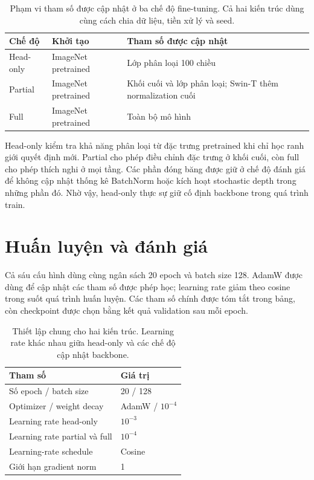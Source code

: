 \documentclass[12pt,a4paper]{report}
\begin{document}
\begin{table}[htbp]\centering
\begin{tabularx}{\textwidth}{@{}l l X@{}}
\toprule
Chế độ & Khởi tạo & Tham số được cập nhật\\\midrule
Head-only & ImageNet pretrained & Lớp phân loại 100 chiều\\
Partial & ImageNet pretrained & Khối cuối và lớp phân loại; Swin-T thêm normalization cuối\\
Full & ImageNet pretrained & Toàn bộ mô hình\\
\bottomrule
\end{tabularx}
\caption{Phạm vi tham số được cập nhật ở ba chế độ fine-tuning. Cả hai kiến trúc dùng cùng cách chia dữ liệu, tiền xử lý và seed.}
\end{table}

Head-only kiểm tra khả năng phân loại từ đặc trưng pretrained khi chỉ học ranh giới quyết định mới. Partial cho phép điều chỉnh đặc trưng ở khối cuối, còn full cho phép thích nghi ở mọi tầng. Các phần đóng băng được giữ ở chế độ đánh giá để không cập nhật thống kê BatchNorm hoặc kích hoạt stochastic depth trong những phần đó. Nhờ vậy, head-only thực sự giữ cố định backbone trong quá trình train.

\section{Huấn luyện và đánh giá}
Cả sáu cấu hình dùng cùng ngân sách 20 epoch và batch size 128. AdamW được dùng để cập nhật các tham số được phép học; learning rate giảm theo cosine trong suốt quá trình huấn luyện. Các tham số chính được tóm tắt trong bảng, còn checkpoint được chọn bằng kết quả validation sau mỗi epoch.

\begin{table}[htbp]\centering
\begin{tabularx}{\textwidth}{Xl}\toprule
Tham số & Giá trị\\\midrule
Số epoch / batch size & 20 / 128\\
Optimizer / weight decay & AdamW / $10^{-4}$\\
Learning rate head-only & $10^{-3}$\\
Learning rate partial và full & $10^{-4}$\\
Learning-rate schedule & Cosine\\
Giới hạn gradient norm & 1\\\bottomrule
\end{tabularx}
\caption{Thiết lập chung cho hai kiến trúc. Learning rate khác nhau giữa head-only và các chế độ cập nhật backbone.}
\end{table}
\end{document}
